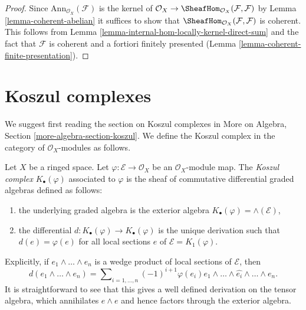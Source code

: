 \begin{proof}
Since $\text{Ann}_{\mathcal{O}_X}(\mathcal{F})$ is the kernel of
$\mathcal{O}_X \to \SheafHom_{\mathcal{O}_X}(\mathcal{F}, \mathcal{F})$
by Lemma \ref{lemma-coherent-abelian} it suffices
to show that $\SheafHom_{\mathcal{O}_X}(\mathcal{F}, \mathcal{F})$ is
coherent. This follows from 
Lemma \ref{lemma-internal-hom-locally-kernel-direct-sum}
and the fact that $\mathcal{F}$ is coherent and a fortiori finitely presented
(Lemma \ref{lemma-coherent-finite-presentation}).
\end{proof}





\section{Koszul complexes}
\label{section-koszul-complex}

\noindent
We suggest first reading the section on Koszul complexes in
More on Algebra, Section \ref{more-algebra-section-koszul}.
We define the Koszul complex in the category of $\mathcal{O}_X$-modules
as follows.

\begin{definition}
\label{definition-koszul}
Let $X$ be a ringed space. Let $\varphi : \mathcal{E} \to \mathcal{O}_X$
be an $\mathcal{O}_X$-module map. The
{\it Koszul complex} $K_\bullet(\varphi)$ associated to $\varphi$
is the sheaf of commutative differential graded algebras defined as follows:
\begin{enumerate}
\item the underlying graded algebra is the exterior algebra
$K_\bullet(\varphi) = \wedge(\mathcal{E})$,
\item the differential $d : K_\bullet(\varphi) \to K_\bullet(\varphi)$
is the unique derivation such that $d(e) = \varphi(e)$ for all
local sections $e$ of $\mathcal{E} = K_1(\varphi)$.
\end{enumerate}
\end{definition}

\noindent
Explicitly, if $e_1 \wedge \ldots \wedge e_n$ is a wedge product of local
sections of $\mathcal{E}$, then
$$
d(e_1 \wedge \ldots \wedge e_n) =
\sum\nolimits_{i = 1, \ldots, n} (-1)^{i + 1}
\varphi(e_i)e_1 \wedge \ldots \wedge \widehat{e_i} \wedge \ldots \wedge e_n.
$$
It is straightforward to see that this gives a well defined derivation
on the tensor algebra, which annihilates $e \wedge e$ and hence factors
through the exterior algebra.

